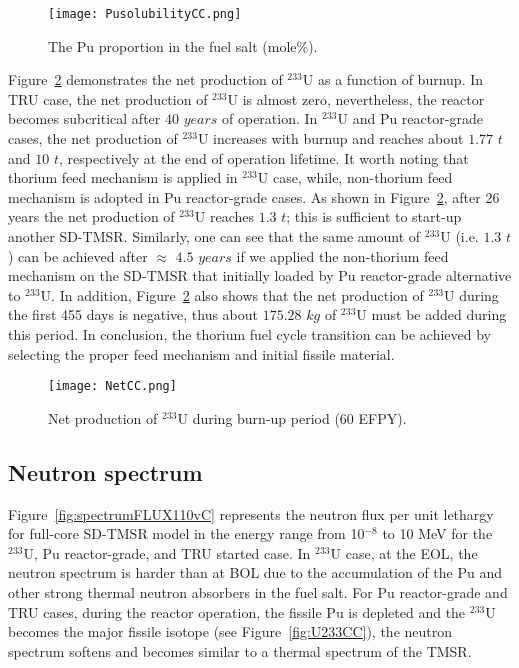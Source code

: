 \begin{figure}
	\centering
	\texttt{[image: PusolubilityCC.png]}
	\caption{The Pu proportion in the fuel salt (mole\%).}
	\label{fig:PusolubilityCC}
\end{figure}

Figure~\ref{fig:NetCC} demonstrates the net production of $^{233}$U as a 
function of burnup. In TRU case, the net production of $^{233}$U is almost 
zero, nevertheless, the reactor becomes subcritical after $40$ $years$ of 
operation. In $^{233}$U and Pu reactor-grade cases, the net production of 
$^{233}$U increases with burnup and reaches about $1.77$ $t$ and $10$ $t$, 
respectively at the end of operation lifetime. It worth noting that thorium 
feed mechanism is applied in $^{233}$U case, while, non-thorium feed mechanism 
is adopted in Pu reactor-grade cases.
As shown in Figure~\ref{fig:NetCC}, after 26 years the net production of $^{233}$U reaches $1.3$ $t$; this is sufficient to start-up another \gls{SD-TMSR}. Similarly, one can see that the same amount of $^{233}$U (i.e. $1.3$ $t$) can be achieved after $\approx$ $4.5$ $years$ if we applied the non-thorium feed mechanism on the SD-TMSR that initially loaded by Pu reactor-grade alternative to $^{233}$U. In addition, Figure~\ref{fig:NetCC} also shows that the net production of $^{233}$U during the first 455 days is negative, thus about $175.28$ $kg$ of $^{233}$U must be added during this period. In conclusion, the thorium fuel cycle transition can be achieved by selecting the proper feed mechanism and initial fissile material. 

\begin{figure}
	\centering
	\texttt{[image: NetCC.png]}
	\caption{Net production of $^{233}$U during burn-up period (60 \gls{EFPY}).}
	\label{fig:NetCC}
\end{figure}

\subsection{Neutron spectrum}

Figure~\ref{fig:spectrumFLUX110vC} represents the neutron flux per unit 
lethargy for full-core SD-TMSR model in the energy range from 10$^{-8}$ to 10 
MeV for the $^{233}$U, Pu reactor-grade, and TRU started case. In $^{233}$U 
case, at the EOL, the neutron spectrum is harder than at BOL due to the 
accumulation of the Pu and other strong thermal neutron absorbers in the fuel 
salt. For Pu reactor-grade and TRU cases, during the reactor operation, the 
fissile Pu is depleted and the $^{233}$U becomes the major fissile isotope 
(see Figure~\ref{fig:U233CC}), the neutron spectrum softens and becomes 
similar to a thermal spectrum of the TMSR.
 
